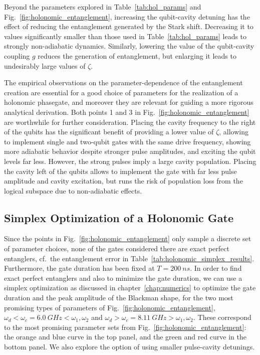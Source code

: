 Beyond the parameters explored in Table~\ref{tab:hol_params} and
Fig.~\ref{fig:holonomic_entanglement}, increasing the qubit-cavity
detuning has the effect of reducing the entanglement generated by the Stark
shift. Decreasing it to values significantly smaller than those used in
Table~\ref{tab:hol_params} leads to strongly non-adiabatic dynamics.
Similarly, lowering the value of the qubit-cavity coupling $g$ reduces the
generation of entanglement, but enlarging it leads to undesirably large values
of $\zeta$.

\enlargethispage{\baselineskip}
The empirical observations on the parameter-dependence of the entanglement
creation are essential for a good choice of parameters for the realization of
a holonomic phasegate, and moreover they are relevant for guiding a more
rigorous analytical derivation. Both points 1 and 3 in
Fig.~\ref{fig:holonomic_entanglement} are worthwhile for further consideration.
Placing the cavity frequency to the right of the qubits has the significant
benefit of providing a lower value of $\zeta$, allowing to implement single and
two-qubit gates with the same drive frequency, showing more adiabatic behavior
despite stronger pulse amplitudes, and exciting the qubit levels far less.
However, the strong pulses imply a large cavity population. Placing the cavity
left of the qubits allows to implement the gate with far less pulse amplitude
and cavity excitation, but runs the risk of population loss from the logical
subspace due to non-adiabatic effects.


\subsection{Simplex Optimization of a Holonomic Gate}
\label{subsec:hol_simplex}

Since the points in Fig.~\ref{fig:holonomic_entanglement} only sample
a discrete set of parameter choices, none of the gates considered there are
exact perfect entanglers, cf.\ the entanglement error in
Table~\ref{tab:holonomic_simplex_results}.
Furthermore, the gate duration has been fixed at $T=\SI{200}{ns}$. In order to
find exact perfect entanglers and also to minimize the gate duration, we can use
a simplex optimization as discussed in chapter~\ref{chap:numerics} to optimize
the gate duration and the peak amplitude of the Blackman shape, for the two most
promising types of parameters of Fig.~\ref{fig:holonomic_entanglement},
$\omega_d < \omega_c=\SI{6.0}{GHz} < \omega_1, \omega_2$ and
$\omega_d > \omega_c=\SI{8.11}{GHz} > \omega_1, \omega_2$.
These correspond to the most promising parameter sets from
Fig.~\ref{fig:holonomic_entanglement}: the orange and blue curve in the top
panel, and the green and red curve in the bottom panel.
We also explore the option of using smaller pulse-cavity detunings.

